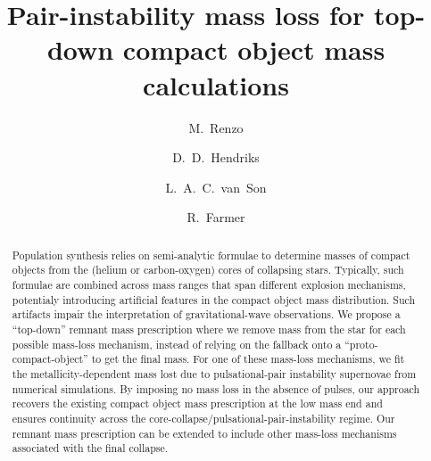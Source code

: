 \documentclass[twocolumn]{aastex63}
\begin{document}
\title{Pair-instability mass loss for top-down compact object mass calculations}

\author[0000-0002-6718-9472]{M.~Renzo}

\author[0000-0002-8717-6046]{D.~D.~Hendriks}

\author[0000-0001-5484-4987]{L.~A.~C.~van~Son}

\author[0000-0003-3441-7624]{R.~Farmer}










\begin{abstract}
  \noindent
  Population synthesis relies on semi-analytic formulae to determine
  masses of compact objects from the (helium or carbon-oxygen) cores of
  collapsing stars. Typically, such formulae are combined across mass
  ranges that span different explosion mechanisms, potentialy
  introducing artificial features in the compact object mass
  distribution. Such artifacts impair the interpretation of
  gravitational-wave observations. We propose a
  ``top-down'' remnant mass prescription where we remove mass from the
  star for each possible mass-loss mechanism, instead of relying on the fallback
  onto a ``proto-compact-object'' to get the final mass. For one of these
  mass-loss mechanisms, we fit
  the metallicity-dependent mass lost due to pulsational-pair instability supernovae
  from numerical simulations. By imposing no mass loss in the absence of
  pulses, our approach recovers the existing compact object mass
  prescription at the low mass end and ensures continuity across the
  core-collapse/pulsational-pair-instability regime. Our remnant mass
  prescription can be extended
  to include other mass-loss mechanisms associated with the final collapse.\\
\end{abstract}
\end{document}
